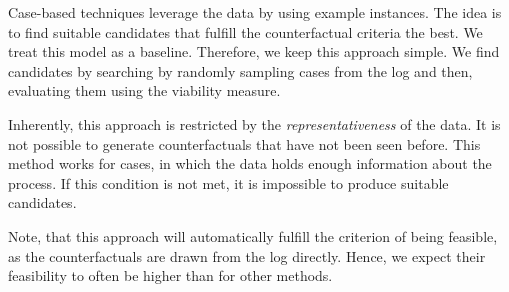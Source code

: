 \documentclass[./../../paper.tex]{subfiles}
\begin{document}
Case-based techniques leverage the data by using example instances. The idea is to find suitable candidates that fulfill the counterfactual criteria the best. We treat this model as a baseline. Therefore, we keep this approach simple. We find candidates by searching by randomly sampling cases from the log and then, evaluating them using the viability measure.

Inherently, this approach is restricted by the \emph{representativeness} of the data. It is not possible to generate counterfactuals that have not been seen before. This method works for cases, in which the data holds enough information about the process. If this condition is not met, it is impossible to produce suitable candidates.

Note, that this approach will automatically fulfill the criterion of being feasible, as the counterfactuals are drawn from the log directly. Hence, we expect their feasibility to often be higher than for other methods.
\end{document}
